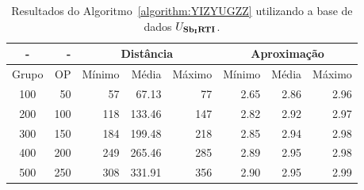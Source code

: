 \begin{table}[!htb]
  \caption{Resultados do Algoritmo~\ref{algorithm:YIZYUGZZ} utilizando a base de dados $U_{\textbf{Sb\textsubscript{I}RTI}}{}$.}
  \label{table:MFWVXYQH}
  \centering
  \begin{tabular}{|c|r|r|r|r|r|r|r|}
    \hline
      -      &  -   & \multicolumn{3}{c|}{Distância}             & \multicolumn{3}{c|}{Aproximação}           \\ \hline
    Grupo    & OP   & Mínimo       & Média        & Máximo       & Mínimo       & Média        & Máximo       \\ \hline  
    100      & 50   & 57           &  67.13       & 77           & 2.65         & 2.86         & 2.96         \\ \hline
    200      & 100  & 118          & 133.46       & 147          & 2.82         & 2.92         & 2.97         \\ \hline
    300      & 150  & 184          & 199.48       & 218          & 2.85         & 2.94         & 2.98         \\ \hline
    400      & 200  & 249          & 265.46       & 285          & 2.89         & 2.95         & 2.98         \\ \hline
    500      & 250  & 308          & 331.91       & 356          & 2.90         & 2.95         & 2.99         \\ \hline    
  \end{tabular}
\end{table}